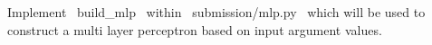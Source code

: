 \item {}

Implement ~build_mlp~ within ~submission/mlp.py~ which will be used to construct a multi layer perceptron based on input argument values.



